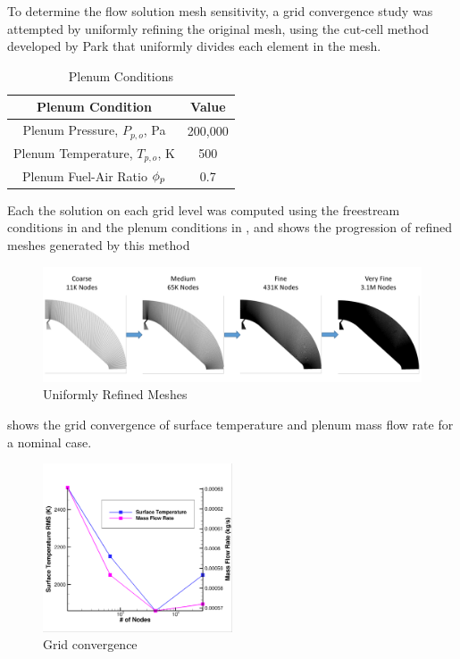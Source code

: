To determine the flow solution mesh sensitivity, a grid convergence study was
attempted by uniformly refining the original mesh, using the cut-cell method
developed by Park\cite{park2008anisotropic} that uniformly divides each element
in the mesh.
\begin{table}[h]
  \centering
  \begin{tabular}{c|c}
    Plenum Condition & Value \\
    \hline
    Plenum Pressure, $P_{p,o}$, Pa   & 200,000 \\
    Plenum Temperature, $T_{p,o}$, K &  500 \\
    Plenum Fuel-Air Ratio $\phi_p$      &  0.7
  \end{tabular}
  \caption{Plenum Conditions}
  \label{tab:plenum-conditions}
\end{table}
Each the solution on each grid level was computed using the freestream
conditions in  and the plenum conditions in
, and  shows the progression
of refined meshes generated by this method
\begin{figure}[h]
  \centering
  \includegraphics[width=\textwidth]{figures/mesh-progression.png}
  \caption{Uniformly Refined Meshes}
  \label{fig:mesh-refined}
\end{figure}
 shows the grid convergence of surface temperature
and plenum mass flow rate for a nominal case.
\begin{figure}[!h]
  \centering
  \includegraphics[width=0.5\textwidth]{figures/t-m-conv.png}
  \caption{Grid convergence }
  \label{fig:grid-convergence}
\end{figure}

